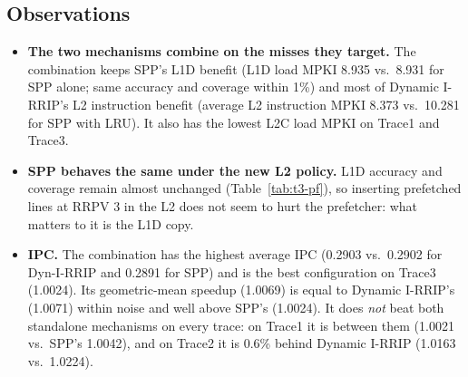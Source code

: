 \documentclass[11pt]{article}
\begin{document}
\subsection{Observations}
\begin{itemize}
  \item \textbf{The two mechanisms combine on the misses they target.} The
        combination keeps SPP's L1D benefit (L1D load MPKI 8.935 vs.\ 8.931 for
        SPP alone; same accuracy and coverage within 1\%) and most of Dynamic
        I-RRIP's L2 instruction benefit (average L2 instruction MPKI 8.373 vs.\
        10.281 for SPP with LRU). It also has the lowest L2C load MPKI on Trace1
        and Trace3.
  \item \textbf{SPP behaves the same under the new L2 policy.} L1D accuracy and
        coverage remain almost unchanged (Table~\ref{tab:t3-pf}), so inserting
        prefetched lines at RRPV 3 in the L2 does not seem to hurt the 
        prefetcher: what matters to it is the L1D copy.
  \item \textbf{IPC.} The combination has the highest average IPC (0.2903 vs.\
        0.2902 for Dyn-I-RRIP and 0.2891 for SPP) and is the best configuration
        on Trace3 (1.0024). Its geometric-mean speedup (1.0069) is equal to
        Dynamic I-RRIP's (1.0071) within noise and well above SPP's (1.0024).
        It does \emph{not} beat both standalone mechanisms on every trace: on
        Trace1 it is between them (1.0021 vs.\ SPP's 1.0042), and on Trace2 it is
        0.6\% behind Dynamic I-RRIP (1.0163 vs.\ 1.0224).
\end{itemize}
\end{document}
